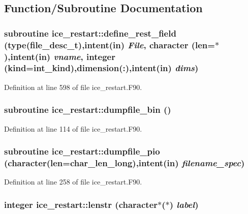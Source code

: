 \subsection{Function/Subroutine Documentation}
\hypertarget{namespaceice__restart_aa51583c33942714cd58c05544b96a5bd}{
\subsubsection[{define\_\-rest\_\-field}]{\setlength{\rightskip}{0pt plus 5cm}subroutine ice\_\-restart::define\_\-rest\_\-field (type(file\_\-desc\_\-t),intent(in) {\em File}, \/  character (len=$\ast$),intent(in) {\em vname}, \/  integer (kind=int\_\-kind),dimension(:),intent(in) {\em dims})}}
\label{namespaceice__restart_aa51583c33942714cd58c05544b96a5bd}


Definition at line 598 of file ice\_\-restart.F90.\hypertarget{namespaceice__restart_af23e2fba277975028e2c7793dc27af3d}{
\subsubsection[{dumpfile\_\-bin}]{\setlength{\rightskip}{0pt plus 5cm}subroutine ice\_\-restart::dumpfile\_\-bin ()}}
\label{namespaceice__restart_af23e2fba277975028e2c7793dc27af3d}


Definition at line 114 of file ice\_\-restart.F90.\hypertarget{namespaceice__restart_a6e7b7e169c2a300f73a29cbe37f22219}{
\subsubsection[{dumpfile\_\-pio}]{\setlength{\rightskip}{0pt plus 5cm}subroutine ice\_\-restart::dumpfile\_\-pio (character(len=char\_\-len\_\-long),intent(in) {\em filename\_\-spec})}}
\label{namespaceice__restart_a6e7b7e169c2a300f73a29cbe37f22219}


Definition at line 258 of file ice\_\-restart.F90.\hypertarget{namespaceice__restart_affff786ae56a7f09bc01c31d71a1333c}{
\subsubsection[{lenstr}]{\setlength{\rightskip}{0pt plus 5cm}integer ice\_\-restart::lenstr (character$\ast$($\ast$) {\em label})}}
\label{namespaceice__restart_affff786ae56a7f09bc01c31d71a1333c}


